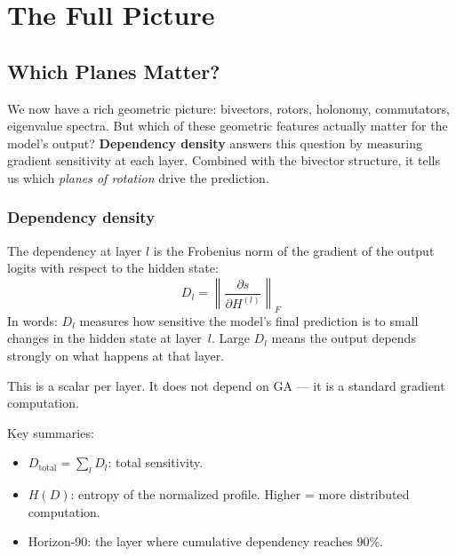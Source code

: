 \documentclass[11pt, twoside, openright]{memoir}
\begin{document}
\part{The Full Picture}
\label{part:synthesis}


\chapter{Which Planes Matter?}
\label{chap:dependency}

\begin{whycare}
We now have a rich geometric picture: bivectors, rotors, holonomy,
commutators, eigenvalue spectra.  But which of these geometric features
actually matter for the model's output?  \textbf{Dependency density}
answers this question by measuring gradient sensitivity at each layer.
Combined with the bivector structure, it tells us which \emph{planes of
rotation} drive the prediction.
\end{whycare}

\section{Dependency density}

The dependency at layer $l$ is the Frobenius norm of the gradient of the
output logits with respect to the hidden state:
\[
  D_l = \left\|\frac{\partial s}{\partial H^{(l)}}\right\|_F
\]
In words: $D_l$ measures how sensitive the model's final prediction is to small changes in the hidden state at layer~$l$. Large $D_l$ means the output depends strongly on what happens at that layer.

This is a scalar per layer.  It does not depend on GA --- it is a
standard gradient computation.

Key summaries:
\begin{itemize}[nosep]
\item $D_{\text{total}} = \sum_l D_l$: total sensitivity.
\item $H(D)$: entropy of the normalized profile.  Higher = more
  distributed computation.
\item Horizon-90: the layer where cumulative dependency reaches 90\%.
\end{itemize}
\end{document}

